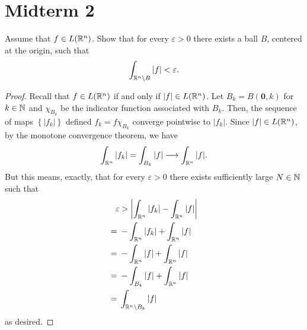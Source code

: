 \section{Midterm 2}
\begin{problem}
Assume that $f\in L(\mathbb{R}^n)$. Show that for every $\varepsilon>0$ there
exists a ball $B$, centered at the origin, such that
\[
\int_{\mathbb{R}^n\setminus B}|f|<\varepsilon.
\]
\end{problem}
\begin{proof}
Recall that $f\in L(\mathbb{R}^n)$ if and only if $|f|\in
L(\mathbb{R}^n)$. Let $B_k= B(\mathbf{0},k)$ for $k\in\mathbb{N}$ and
$\chi_{B_k}$ be the indicator function associated with $B_k$. Then, the
sequence of maps $\left\{|f_k|\right\}$ defined $f_k= f\chi_{B_k}$
converge pointwise to $|f_k|$. Since $|f|\in L(\mathbb{R}^n)$, by the monotone
convergence theorem, we have
\begin{equation}
\label{eq:monotonicity-2-1}
\int_{\mathbb{R}^n} |f_k|=\int_{B_k}|f|\longrightarrow\int_{\mathbb{R}^n}|f|.
\end{equation}
But this means, exactly, that for every $\varepsilon>0$ there exists
sufficiently large $N\in\mathbb{N}$ such that
\begin{equation}
\label{eq:desired-inequality-2-1}
\begin{aligned}
\varepsilon&>\left|\int_{\mathbb{R}^n}|f_k|-\int_{\mathbb{R}^n}|f|\right|\\
={}&-\int_{\mathbb{R}^n}|f_k|+\int_{\mathbb{R}^n}|f|\\
={}&-\int_{\mathbb{R}^n}|f|+\int_{\mathbb{R}^n}|f|\\
={}&-\int_{B_k}|f|+\int_{\mathbb{R}^n}|f|\\
={}&\int_{\mathbb{R}^n\setminus B_k}|f|
\end{aligned}
\end{equation}
as desired.
\end{proof}


